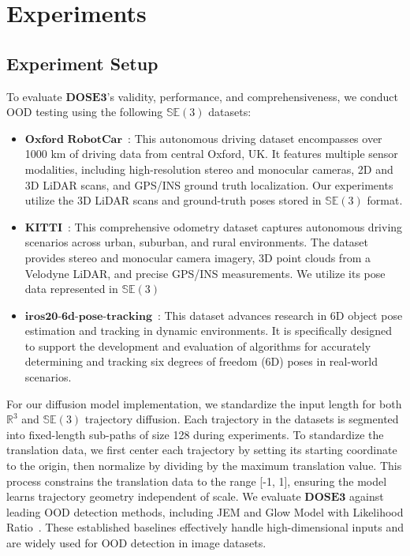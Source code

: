 \section{Experiments}
\subsection{Experiment Setup}
To evaluate $\mathbf{DOSE3}$'s validity, performance, and comprehensiveness, we conduct \ac{OOD} testing using the following $\mathbb{SE}(3)$ datasets:
\begin{itemize}
\item $\textbf{Oxford RobotCar}$~\citep{RobotCarDatasetIJRR}: This autonomous driving dataset encompasses over 1000 km of driving data from central Oxford, UK. It features multiple sensor modalities, including high-resolution stereo and monocular cameras, 2D and 3D LiDAR scans, and GPS/INS ground truth localization. Our experiments utilize the 3D LiDAR scans and ground-truth poses stored in $\mathbb{SE}(3)$ format.
\item $\textbf{KITTI}$~\citep{Geiger2012CVPR}: This comprehensive odometry dataset captures autonomous driving scenarios across urban, suburban, and rural environments. The dataset provides stereo and monocular camera imagery, 3D point clouds from a Velodyne LiDAR, and precise GPS/INS measurements. We utilize its pose data represented in $\mathbb{SE}(3)$
\item $\textbf{iros20-6d-pose-tracking}$~\citep{wen2020se}: This dataset advances research in 6D object pose estimation and tracking in dynamic environments. It is specifically designed to support the development and evaluation of algorithms for accurately determining and tracking six degrees of freedom (6D) poses in real-world scenarios.
\end{itemize}
For our diffusion model implementation, we standardize the input length for both $\mathbb{R}^{3}$ and $\mathbb{SE}(3)$ trajectory diffusion. Each trajectory in the datasets is segmented into fixed-length sub-paths of size 128 during experiments.
To standardize the translation data, we first center each trajectory by setting its starting coordinate to the origin, then normalize by dividing by the maximum translation value. This process constrains the translation data to the range [-1, 1], ensuring the model learns trajectory geometry independent of scale.
We evaluate $\mathbf{DOSE3}$ against leading \ac{OOD} detection methods, including \ac{JEM}\citep{Grathwohl2020Your} and Glow Model\citep{NEURIPS2018_d139db6a} with Likelihood Ratio~\citep{NEURIPS2019_1e795968}. These established baselines effectively handle high-dimensional inputs and are widely used for \ac{OOD} detection in image datasets.
